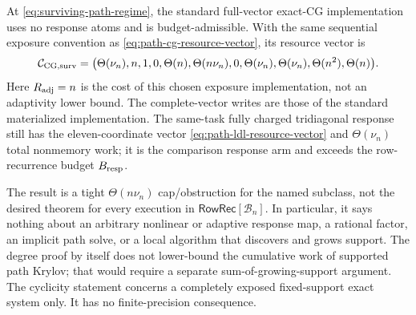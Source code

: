 At \cref{eq:surviving-path-regime}, the standard full-vector exact-CG
implementation uses no response atoms and is budget-admissible.  With the
same sequential exposure convention as \cref{eq:path-cg-resource-vector}, its
resource vector is
\begin{equation}
 \mathcal C_{\rm CG,surv}=\bigl(
 \Theta(\nu_n),n,1,0,\Theta(n),\Theta(n\nu_n),0,
 \Theta(\nu_n),\Theta(\nu_n),\Theta(n^2),\Theta(n)\bigr).
 \label{eq:surviving-path-cg-resource-vector}
\end{equation}
Here $R_{\rm adj}=n$ is the cost of this chosen exposure implementation, not
an adaptivity lower bound.  The complete-vector writes are those of the
standard materialized implementation.  The same-task fully charged
tridiagonal response still has the eleven-coordinate vector
\cref{eq:path-ldl-resource-vector} and $\Theta(\nu_n)$ total nonmemory work;
it is the comparison response arm and exceeds the row-recurrence budget
$B_{\rm resp}$.

The result is a tight $\Theta(n\nu_n)$ cap/obstruction for the named subclass,
not the desired theorem for every execution in
$\mathsf{RowRec}[\mathcal B_n]$.  In particular, it says nothing about an
arbitrary nonlinear or adaptive response map, a rational factor, an implicit
path solve, or a local algorithm that discovers and grows support.  The
degree proof by itself does not lower-bound the cumulative work of supported
path Krylov; that would require a separate sum-of-growing-support argument.
The cyclicity statement concerns a completely exposed fixed-support exact system
only.  It has no finite-precision consequence.
